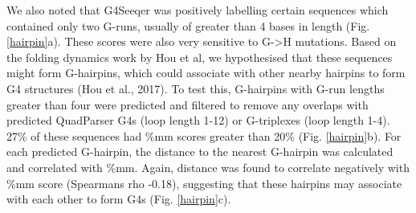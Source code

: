 \documentclass[12pt,a4paper,]{report}
\begin{document}
\newpage

We also noted that G4Seeqer was positively labelling certain sequences
which contained only two G-runs, usually of greater than 4 bases in
length (Fig. \ref{hairpin}a). These scores were also very sensitive to
G-\textgreater{}H mutations. Based on the folding dynamics work by Hou
et al, we hypothesised that these sequences might form G-hairpins, which
could associate with other nearby hairpins to form G4 structures (Hou et
al., 2017). To test this, G-hairpins with G-run lengths greater than
four were predicted and filtered to remove any overlaps with predicted
QuadParser G4s (loop length 1-12) or G-triplexes (loop length 1-4). 27\%
of these sequences had \%mm scores greater than 20\% (Fig.
\ref{hairpin}b). For each predicted G-hairpin, the distance to the
nearest G-hairpin was calculated and correlated with \%mm. Again,
distance was found to correlate negatively with \%mm score (Spearmans
rho -0.18), suggesting that these hairpins may associate with each other
to form G4s (Fig. \ref{hairpin}c).

\newpage
\end{document}
